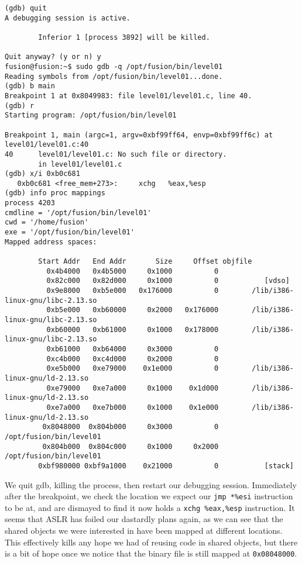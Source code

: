 \begin{lstlisting}
(gdb) quit
A debugging session is active.

        Inferior 1 [process 3892] will be killed.

Quit anyway? (y or n) y
fusion@fusion:~$ sudo gdb -q /opt/fusion/bin/level01
Reading symbols from /opt/fusion/bin/level01...done.
(gdb) b main
Breakpoint 1 at 0x8049983: file level01/level01.c, line 40.
(gdb) r
Starting program: /opt/fusion/bin/level01 

Breakpoint 1, main (argc=1, argv=0xbf99ff64, envp=0xbf99ff6c) at level01/level01.c:40
40      level01/level01.c: No such file or directory.
        in level01/level01.c
(gdb) x/i 0xb0c681
   0xb0c681 <free_mem+273>:     xchg   %eax,%esp
(gdb) info proc mappings
process 4203
cmdline = '/opt/fusion/bin/level01'
cwd = '/home/fusion'
exe = '/opt/fusion/bin/level01'
Mapped address spaces:

        Start Addr   End Addr       Size     Offset objfile
          0x4b4000   0x4b5000     0x1000          0        
          0x82c000   0x82d000     0x1000          0           [vdso]
          0x9e8000   0xb5e000   0x176000          0        /lib/i386-linux-gnu/libc-2.13.so
          0xb5e000   0xb60000     0x2000   0x176000        /lib/i386-linux-gnu/libc-2.13.so
          0xb60000   0xb61000     0x1000   0x178000        /lib/i386-linux-gnu/libc-2.13.so
          0xb61000   0xb64000     0x3000          0        
          0xc4b000   0xc4d000     0x2000          0        
          0xe5b000   0xe79000    0x1e000          0        /lib/i386-linux-gnu/ld-2.13.so
          0xe79000   0xe7a000     0x1000    0x1d000        /lib/i386-linux-gnu/ld-2.13.so
          0xe7a000   0xe7b000     0x1000    0x1e000        /lib/i386-linux-gnu/ld-2.13.so
         0x8048000  0x804b000     0x3000          0       /opt/fusion/bin/level01
         0x804b000  0x804c000     0x1000     0x2000       /opt/fusion/bin/level01
        0xbf980000 0xbf9a1000    0x21000          0           [stack]
\end{lstlisting}

We quit gdb, killing the process, then restart our debugging session.
Immediately after the breakpoint, we check the location we
expect our \texttt{jmp *\%esi} instruction to be at, and are dismayed
to find it now holds a \texttt{xchg \%eax,\%esp} instruction. It seems
that ASLR has foiled our dastardly plans again, as we can see that
the shared objects we were interested in have been mapped at different locations.
This effectively kills any hope we had of reusing code in
shared objects, but there is a bit of hope once we notice that
the binary file is still mapped at \texttt{0x08048000}.


